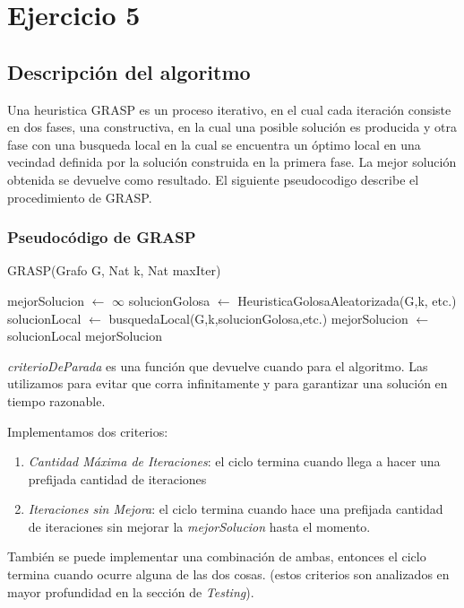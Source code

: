 \section{Ejercicio 5}
\subsection{Descripción del algoritmo}
Una heuristica GRASP es un proceso iterativo, en el cual cada iteración consiste en dos fases, una constructiva, en la cual una posible solución es producida y otra fase con una busqueda local en la cual se encuentra un óptimo local en una vecindad definida por la solución construida en la primera fase.
La mejor solución obtenida se devuelve como resultado.
El siguiente pseudocodigo describe el procedimiento de GRASP.

\subsubsection{Pseudocódigo de GRASP}
\begin{algorithm}[H]
\begin{algorithmic}[1]
\caption{GRASP(Grafo G, Nat k, Nat maxIter)}
\STATE mejorSolucion $\leftarrow$ $\infty$
    \STATE solucionGolosa $\leftarrow$ HeuristicaGolosaAleatorizada(G,k, etc.)
    \STATE solucionLocal $\leftarrow$ busquedaLocal(G,k,solucionGolosa,etc.)
        \STATE mejorSolucion $\leftarrow$ solucionLocal 
    \ENDIF
\ENDWHILE
\RETURN mejorSolucion
\end{algorithmic}
\end{algorithm}

\textit{criterioDeParada} es una función que devuelve cuando para el algoritmo. Las utilizamos para evitar que corra infinitamente y para garantizar una solución en tiempo razonable. 

Implementamos dos criterios:
\begin{enumerate}
    \item \textit{Cantidad Máxima de Iteraciones}: el ciclo termina cuando llega a hacer una prefijada cantidad de iteraciones 
    \item \textit{Iteraciones sin Mejora}: el ciclo termina cuando hace una prefijada cantidad de iteraciones sin mejorar la \textit{mejorSolucion} hasta el momento.
\end{enumerate} 
También se puede implementar una combinación de ambas, entonces el ciclo termina cuando ocurre alguna de las dos cosas. (estos criterios son analizados en mayor profundidad en la sección de \textit{Testing}).

